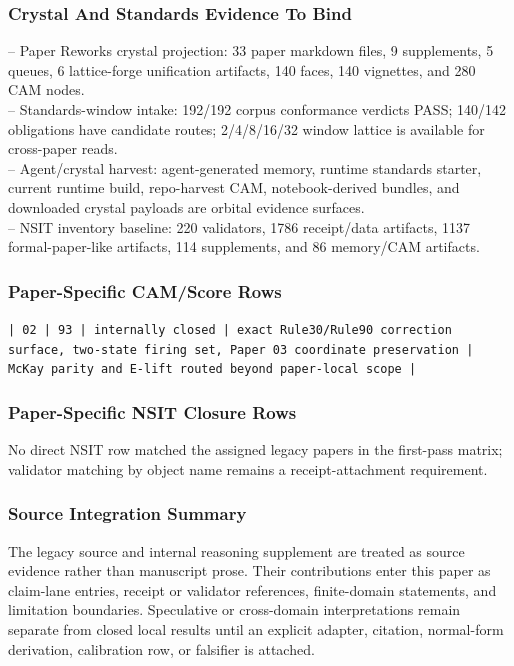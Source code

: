 \documentclass[11pt]{article}
\begin{document}
\subsubsection*{Crystal And Standards Evidence To Bind}

\noindent{}-- Paper Reworks crystal projection: 33 paper markdown files, 9 supplements, 5 queues, 6 lattice-forge unification artifacts, 140 faces, 140 vignettes, and 280 CAM nodes.\\
\noindent{}-- Standards-window intake: 192/192 corpus conformance verdicts PASS; 140/142 obligations have candidate routes; 2/4/8/16/32 window lattice is available for cross-paper reads.\\
\noindent{}-- Agent/crystal harvest: agent-generated memory, runtime standards starter, current runtime build, repo-harvest CAM, notebook-derived bundles, and downloaded crystal payloads are orbital evidence surfaces.\\
\noindent{}-- NSIT inventory baseline: 220 validators, 1786 receipt/data artifacts, 1137 formal-paper-like artifacts, 114 supplements, and 86 memory/CAM artifacts.\\

\subsubsection*{Paper-Specific CAM/Score Rows}

\noindent\texttt{| 02 | 93 | internally closed | exact Rule30/Rule90 correction surface, two-state firing set, Paper 03 coordinate preservation | McKay parity and E-lift routed beyond paper-local scope |}\\

\subsubsection*{Paper-Specific NSIT Closure Rows}

No direct NSIT row matched the assigned legacy papers in the first-pass matrix; validator matching by object name remains a receipt-attachment requirement.

\subsubsection*{Source Integration Summary}

The legacy source and internal reasoning supplement are treated as source
evidence rather than manuscript prose. Their contributions enter this paper as
claim-lane entries, receipt or validator references, finite-domain statements,
and limitation boundaries. Speculative or cross-domain interpretations remain
separate from closed local results until an explicit adapter, citation,
normal-form derivation, calibration row, or falsifier is attached.
\end{document}
